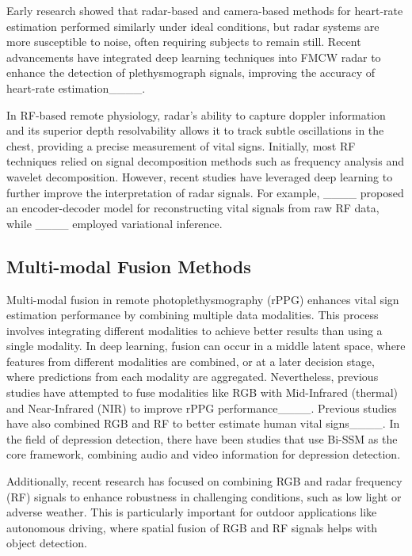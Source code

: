 Early research showed that radar-based and camera-based methods for heart-rate estimation performed similarly under ideal conditions, but radar systems are more susceptible to noise, often requiring subjects to remain still. Recent advancements have integrated deep learning techniques into FMCW radar to enhance the detection of plethysmograph signals, improving the accuracy of heart-rate estimation____.




In RF-based remote physiology, radar’s ability to capture doppler information and its superior depth resolvability allows it to track subtle oscillations in the chest, providing a precise measurement of vital signs. Initially, most RF techniques relied on signal decomposition methods such as frequency analysis and wavelet decomposition. However, recent studies have leveraged deep learning to further improve the interpretation of radar signals. For example, ____ proposed an encoder-decoder model for reconstructing vital signals from raw RF data, while ____ employed variational inference.

\vspace{-0.8em}
\subsection{Multi-modal Fusion Methods}
Multi-modal fusion in remote photoplethysmography (rPPG) enhances vital sign estimation performance by combining multiple data modalities. This process involves integrating different modalities to achieve better results than using a single modality. In deep learning, fusion can occur in a middle latent space, where features from different modalities are combined, or at a later decision stage, where predictions from each modality are aggregated. Nevertheless, previous studies have attempted to fuse modalities like RGB with Mid-Infrared (thermal) and Near-Infrared (NIR) to improve rPPG performance____. Previous studies have also combined RGB and RF to better estimate human vital signs____. In the field of depression detection, there have been studies that use Bi-SSM as the core framework, combining audio and video information for depression detection.

Additionally, recent research has focused on combining RGB and radar frequency (RF) signals to enhance robustness in challenging conditions, such as low light or adverse weather. This is particularly important for outdoor applications like autonomous driving, where spatial fusion of RGB and RF signals helps with object detection.

